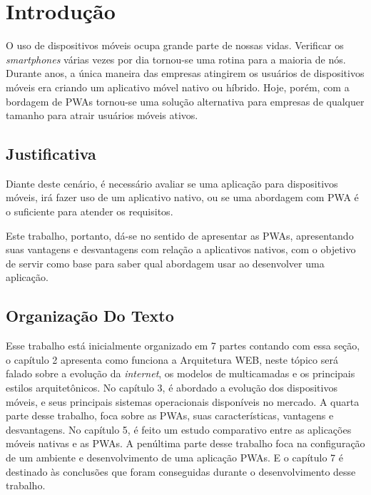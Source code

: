 
\chapter{Introdução}

O uso de dispositivos móveis ocupa grande parte de nossas vidas. Verificar os \textit{smartphones} várias vezes por dia tornou-se uma rotina para a maioria de nós. Durante anos, a única maneira das empresas atingirem os usuários de dispositivos móveis era criando um aplicativo móvel nativo ou híbrido. Hoje, porém, com a bordagem de \ac{PWA}s tornou-se uma solução alternativa para empresas de qualquer tamanho para atrair usuários móveis ativos.

\section{Justificativa}
Diante deste cenário, é necessário avaliar se uma aplicação para dispositivos móveis, irá fazer uso de um aplicativo nativo, ou se uma abordagem com \ac{PWA} é o suficiente para atender os requisitos.

Este trabalho, portanto, dá-se no sentido de apresentar as \ac{PWA}s, apresentando suas vantagens e desvantagens com relação a aplicativos nativos, com o objetivo de  servir como base para saber qual abordagem usar ao desenvolver uma aplicação.

\section{Organização Do Texto}
Esse trabalho está inicialmente organizado em 7 partes contando com essa seção,
o capítulo 2 apresenta como funciona a Arquitetura WEB, neste tópico será falado sobre a evolução da \textit{internet}, os modelos de multicamadas e os principais estilos arquitetônicos. No capítulo 3, é abordado a  evolução dos dispositivos móveis, e seus principais sistemas operacionais disponíveis no mercado.  A quarta parte desse trabalho, foca sobre as \ac{PWA}s, suas características, vantagens e desvantagens. No capítulo 5, é feito um estudo comparativo entre as aplicações móveis nativas e as {PWA}s. A penúltima parte desse trabalho foca na  configuração de um ambiente  e desenvolvimento de uma aplicação \ac{PWA}s.
E  o capítulo 7 é destinado às conclusões que foram conseguidas durante o desenvolvimento desse trabalho.

